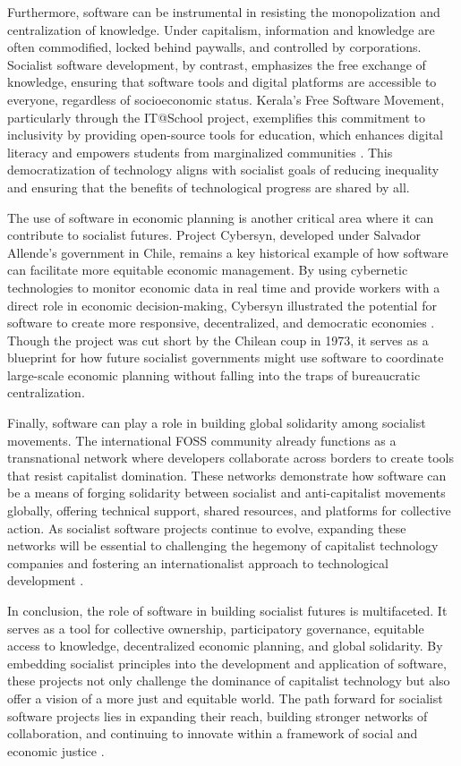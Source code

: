 \begin{refsection}
Furthermore, software can be instrumental in resisting the monopolization and centralization of knowledge. Under capitalism, information and knowledge are often commodified, locked behind paywalls, and controlled by corporations. Socialist software development, by contrast, emphasizes the free exchange of knowledge, ensuring that software tools and digital platforms are accessible to everyone, regardless of socioeconomic status. Kerala’s Free Software Movement, particularly through the IT@School project, exemplifies this commitment to inclusivity by providing open-source tools for education, which enhances digital literacy and empowers students from marginalized communities \cite[pp.~20-21]{kwet2021}. This democratization of technology aligns with socialist goals of reducing inequality and ensuring that the benefits of technological progress are shared by all.

The use of software in economic planning is another critical area where it can contribute to socialist futures. Project Cybersyn, developed under Salvador Allende’s government in Chile, remains a key historical example of how software can facilitate more equitable economic management. By using cybernetic technologies to monitor economic data in real time and provide workers with a direct role in economic decision-making, Cybersyn illustrated the potential for software to create more responsive, decentralized, and democratic economies \cite[pp.~189-191]{medina2014}. Though the project was cut short by the Chilean coup in 1973, it serves as a blueprint for how future socialist governments might use software to coordinate large-scale economic planning without falling into the traps of bureaucratic centralization.

Finally, software can play a role in building global solidarity among socialist movements. The international FOSS community already functions as a transnational network where developers collaborate across borders to create tools that resist capitalist domination. These networks demonstrate how software can be a means of forging solidarity between socialist and anti-capitalist movements globally, offering technical support, shared resources, and platforms for collective action. As socialist software projects continue to evolve, expanding these networks will be essential to challenging the hegemony of capitalist technology companies and fostering an internationalist approach to technological development \cite[pp.~45]{stallman2010}.

In conclusion, the role of software in building socialist futures is multifaceted. It serves as a tool for collective ownership, participatory governance, equitable access to knowledge, decentralized economic planning, and global solidarity. By embedding socialist principles into the development and application of software, these projects not only challenge the dominance of capitalist technology but also offer a vision of a more just and equitable world. The path forward for socialist software projects lies in expanding their reach, building stronger networks of collaboration, and continuing to innovate within a framework of social and economic justice \cite[pp.~156]{feinberg2016}.\printbibliography[heading=subbibliography]
\end{refsection}